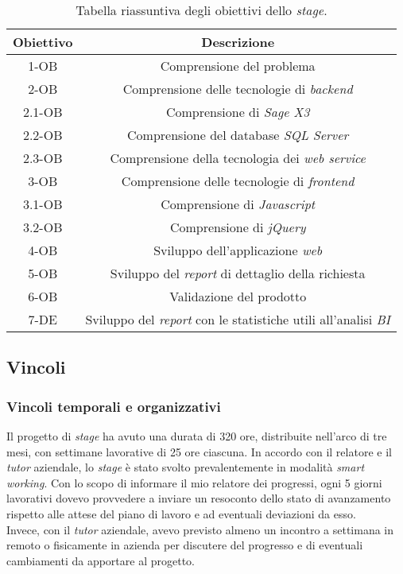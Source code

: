 \begin{center}
	\begin{longtable}{|c|c|}
		\caption{Tabella riassuntiva degli obiettivi dello \textit{stage}.}
		\label{table:obiettivi}\\
		\hline
		\textbf{Obiettivo} & \textbf{Descrizione}\\
		\hline
		1-OB & Comprensione del problema\\
		\hline
		2-OB & Comprensione delle tecnologie di \textit{backend}\\
		\hline
		2.1-OB & Comprensione di \textit{Sage X3}\\
		\hline
		2.2-OB & Comprensione del database \textit{SQL Server}\\
		\hline
		2.3-OB & Comprensione della tecnologia dei \textit{web service}\\
		\hline
		3-OB & Comprensione delle tecnologie di \textit{frontend}\\
		\hline
		3.1-OB & Comprensione di \textit{Javascript}\\
		\hline
		3.2-OB & Comprensione di \textit{jQuery}\\
		\hline
		4-OB & Sviluppo dell'applicazione \textit{web}\\
		\hline
		5-OB & Sviluppo del \textit{report} di dettaglio della richiesta\\
		\hline
		6-OB & Validazione del prodotto\\
		\hline
		7-DE & Sviluppo del \textit{report} con le statistiche utili all'analisi \textit{BI}\\
		\hline
	\end{longtable}
\end{center}


\subsection{Vincoli}
\subsubsection{Vincoli temporali e organizzativi}
Il progetto di \textit{stage} ha avuto una durata di 320 ore, distribuite nell'arco di tre mesi, con settimane lavorative di 25 ore ciascuna.
In accordo con il relatore e il \textit{tutor} aziendale, lo \textit{stage} è stato svolto prevalentemente in modalità \textit{smart working}.
Con lo scopo di informare il mio relatore  dei progressi, ogni 5 giorni lavorativi dovevo provvedere a inviare un resoconto dello stato di avanzamento rispetto alle attese del piano di lavoro e ad eventuali deviazioni da esso.\\Invece, con il \textit{tutor} aziendale, avevo previsto almeno un incontro a settimana in remoto o fisicamente in azienda per discutere del progresso e di eventuali cambiamenti da apportare al progetto.
